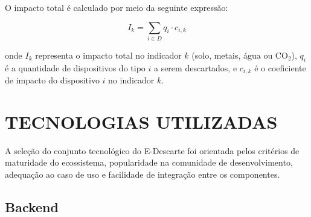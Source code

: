 \documentclass[12pt, a4paper]{article}
\numberwithin{equation}{section}
\numberwithin{figure}{section}
\numberwithin{table}{section}
\begin{document}
O impacto total é calculado por meio da seguinte expressão:

\begin{equation}
  I_k = \sum_{i \in D} q_i \cdot c_{i,k}
  \label{eq:impacto}
\end{equation}

\noindent
onde $I_k$ representa o impacto total no indicador $k$ (solo, metais, água ou
CO$_2$), $q_i$ é a quantidade de dispositivos do tipo $i$ a serem descartados,
e $c_{i,k}$ é o coeficiente de impacto do dispositivo $i$ no indicador $k$.

\section{TECNOLOGIAS UTILIZADAS}

A seleção do conjunto tecnológico do E-Descarte foi orientada pelos critérios
de maturidade do ecossistema, popularidade na comunidade de desenvolvimento,
adequação ao caso de uso e facilidade de integração entre os componentes.

\subsection{Backend}
\end{document}
